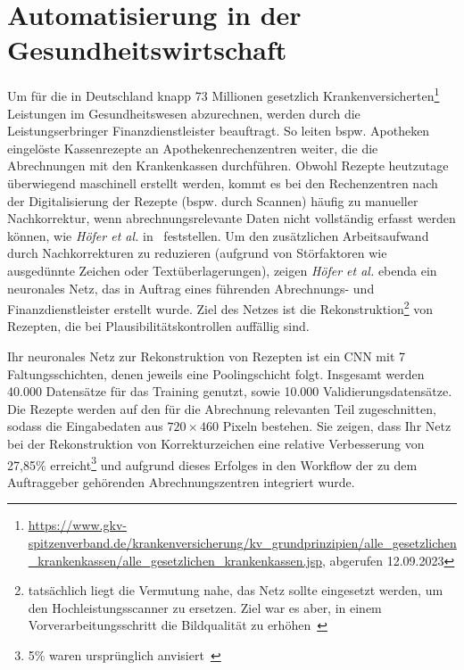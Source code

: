 \section{Automatisierung in der Gesundheitswirtschaft}
Um für die in Deutschland knapp 73 Millionen gesetzlich Krankenversicherten\footnote{
    \url{https://www.gkv-spitzenverband.de/krankenversicherung/kv_grundprinzipien/alle_gesetzlichen_krankenkassen/alle_gesetzlichen_krankenkassen.jsp}, abgerufen 12.09.2023
} Leistungen im Gesundheitswesen abzurechnen, werden durch die Leistungserbringer Finanzdienstleister beauftragt. So leiten bspw. Apotheken eingelöste Kassenrezepte an Apothekenrechenzentren weiter, die die Abrechnungen mit den Krankenkassen durchführen. Obwohl Rezepte heutzutage überwiegend maschinell erstellt werden, kommt es bei den Rechenzentren nach der Digitalisierung der Rezepte (bspw. durch Scannen) häufig zu manueller Nachkorrektur, wenn abrechnungsrelevante Daten nicht vollständig erfasst werden können, wie \textit{Höfer et al.} in~\cite[698]{HWN22} feststellen. Um den zusätzlichen Arbeitsaufwand durch Nachkorrekturen zu reduzieren (aufgrund von Störfaktoren wie ausgedünnte Zeichen oder Textüberlagerungen), zeigen \textit{Höfer et al.} ebenda ein neuronales Netz, das in Auftrag eines führenden Abrechnungs- und Finanzdienstleister erstellt wurde. Ziel des Netzes ist die Rekonstruktion\footnote{
    tatsächlich liegt die Vermutung nahe, das Netz sollte eingesetzt werden, um den Hochleistungsscanner zu ersetzen. Ziel war es aber, in einem Vorverarbeitungsschritt die Bildqualität zu erhöhen~\cite[698]{HWN22}
} von Rezepten, die bei Plausibilitätskontrollen auffällig sind.

Ihr neuronales Netz zur Rekonstruktion von Rezepten ist ein CNN mit 7 Faltungsschichten, denen jeweils eine Poolingschicht folgt. Insgesamt werden 40.000 Datensätze für das Training genutzt, sowie 10.000 Validierungsdatensätze. Die Rezepte werden auf den für die Abrechnung relevanten Teil zugeschnitten, sodass die Eingabedaten aus $720 \times 460$ Pixeln bestehen. Sie zeigen, dass Ihr Netz bei der Rekonstruktion von Korrekturzeichen eine relative Verbesserung von 27,85\% erreicht\footnote{
    5\% waren ursprünglich anvisiert~\cite[711]{HWN22}
} und aufgrund dieses Erfolges in den  Workflow der zu dem Auftraggeber gehörenden Abrechnungszentren integriert wurde.


